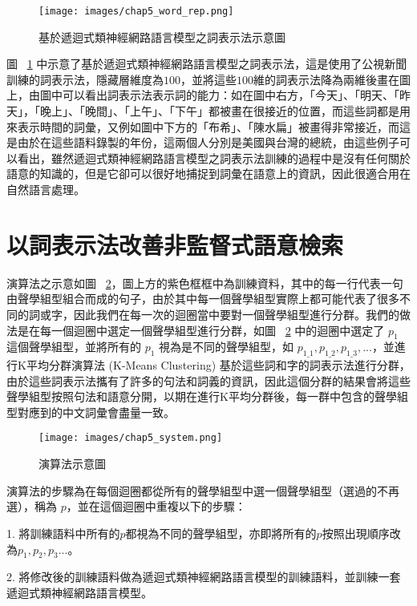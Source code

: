 \begin{figure}
\centering
\texttt{[image: images/chap5\_word\_rep.png]}
\caption{基於遞迴式類神經網路語言模型之詞表示法示意圖} \label{fig:chap5_word_rep}
\end{figure}

圖 ~\ref{fig:chap5_word_rep}
中示意了基於遞迴式類神經網路語言模型之詞表示法，這是使用了公視新聞訓練的詞表示法，隱藏層維度為$100$，並將這些$100$維的詞表示法降為兩維後畫在圖上，由圖中可以看出詞表示法表示詞的能力：如在圖中右方，「今天」、「明天、「昨天」，「晚上」、「晚間」、「上午」、「下午」都被畫在很接近的位置，而這些詞都是用來表示時間的詞彙，又例如圖中下方的「布希」、「陳水扁」被畫得非常接近，而這是由於在這些語料錄製的年份，這兩個人分別是美國與台灣的總統，由這些例子可以看出，雖然遞迴式類神經網路語言模型之詞表示法訓練的過程中是沒有任何關於語意的知識的，但是它卻可以很好地捕捉到詞彙在語意上的資訊，因此很適合用在自然語言處理。

\section{以詞表示法改善非監督式語意檢索}
\label{sec:chap5_algorithm}
演算法之示意如圖 ~\ref{fig:chap5_system}，圖上方的紫色框框中為訓練資料，其中的每一行代表一句由聲學組型組合而成的句子，由於其中每一個聲學組型實際上都可能代表了很多不同的詞或字，因此我們在每一次的迴圈當中要對一個聲學組型進行分群。我們的做法是在每一個迴圈中選定一個聲學組型進行分群，如圖 ~\ref{fig:chap5_system} 中的迴圈中選定了 $p_1$ 這個聲學組型，並將所有的 $p_1$ 視為是不同的聲學組型，如 $p_{1\_1},
p_{1\_2}, p_{1\_3}, ...$，並進行K平均分群演算法 (K-Means Clustering) 基於這些詞和字的詞表示法進行分群，由於這些詞表示法攜有了許多的句法和詞義的資訊，因此這個分群的結果會將這些聲學組型按照句法和語意分開，以期在進行K平均分群後，每一群中包含的聲學組型對應到的中文詞彙會盡量一致。

\begin{figure}
\centering
\texttt{[image: images/chap5\_system.png]}
\caption{演算法示意圖} \label{fig:chap5_system}
\end{figure}

演算法的步驟為在每個迴圈都從所有的聲學組型中選一個聲學組型（選過的不再選），稱為 $p$，並在這個迴圈中重複以下的步驟：

1. 將訓練語料中所有的$p$都視為不同的聲學組型，亦即將所有的$p$按照出現順序改為$p_1, p_2, p_3...$。

2. 將修改後的訓練語料做為遞迴式類神經網路語言模型的訓練語料，並訓練一套遞迴式類神經網路語言模型。


